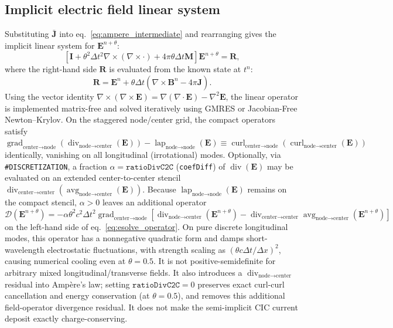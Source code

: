\documentclass[a4paper, 11pt]{article}
\begin{document}
\subsection{Implicit electric field linear system}

Substituting $\bar{\mathbf{J}}$ into eq.~\eqref{eq:ampere_intermediate} and rearranging gives the implicit linear system for $\mathbf{E}^{n+\theta}$:
\begin{equation}
\left[ \mathbf{I} + \theta^2 \Delta t^2 \nabla \times (\nabla \times \cdot) + 4\pi \theta \Delta t \mathbf{M} \right] \mathbf{E}^{n+\theta} = \mathbf{R},
\label{eq:esolve_operator}
\end{equation}
where the right-hand side $\mathbf{R}$ is evaluated from the known state at $t^n$:
\begin{equation}
\mathbf{R} = \mathbf{E}^n + \theta \Delta t \left( \nabla \times \mathbf{B}^n - 4\pi \hat{\mathbf{J}} \right).
\end{equation}
Using the vector identity $\nabla \times (\nabla \times \mathbf{E}) = \nabla (\nabla \cdot \mathbf{E}) - \nabla^2 \mathbf{E}$, the linear operator is implemented matrix-free and solved iteratively using GMRES or Jacobian-Free Newton--Krylov.
On the staggered node/center grid, the compact operators satisfy $\operatorname{grad}_{\text{center}\to\text{node}}(\operatorname{div}_{\text{node}\to\text{center}}(\mathbf{E})) - \operatorname{lap}_{\text{node}\to\text{node}}(\mathbf{E}) \equiv \operatorname{curl}_{\text{center}\to\text{node}}(\operatorname{curl}_{\text{node}\to\text{center}}(\mathbf{E}))$ identically, vanishing on all longitudinal (irrotational) modes.
Optionally, via \texttt{\#DISCRETIZATION}, a fraction $\alpha = \texttt{ratioDivC2C}$ (\texttt{coefDiff}) of $\operatorname{div}(\mathbf{E})$ may be evaluated on an extended center-to-center stencil $\operatorname{div}_{\text{center}\to\text{center}}(\operatorname{avg}_{\text{node}\to\text{center}}(\mathbf{E}))$. Because $\operatorname{lap}_{\text{node}\to\text{node}}(\mathbf{E})$ remains on the compact stencil, $\alpha > 0$ leaves an additional operator $\mathcal{D}(\mathbf{E}^{n+\theta}) = -\alpha \theta^2 c^2 \Delta t^2 \operatorname{grad}_{\text{center}\to\text{node}}[\operatorname{div}_{\text{node}\to\text{center}}(\mathbf{E}^{n+\theta}) - \operatorname{div}_{\text{center}\to\text{center}}\operatorname{avg}_{\text{node}\to\text{center}}(\mathbf{E}^{n+\theta})]$ on the left-hand side of eq.~\eqref{eq:esolve_operator}. On pure discrete longitudinal modes, this operator has a nonnegative quadratic form and damps short-wavelength electrostatic fluctuations, with strength scaling as $(\theta c \Delta t / \Delta x)^2$, causing numerical cooling even at $\theta = 0.5$. It is not positive-semidefinite for arbitrary mixed longitudinal/transverse fields. It also introduces a $\operatorname{div}_{\text{node}\to\text{center}}$ residual into Amp\`ere's law; setting $\texttt{ratioDivC2C} = 0$ preserves exact curl-curl cancellation and energy conservation (at $\theta = 0.5$), and removes this additional field-operator divergence residual. It does not make the semi-implicit CIC current deposit exactly charge-conserving.
\end{document}
